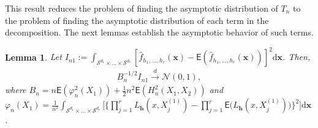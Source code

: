\documentclass{article}
\newtheorem{lemma}{Lemma}[section]
\begin{document}
This result reduces the problem of finding the asymptotic distribution of $T_n$ to the problem of finding the asymptotic distribution of each term in the decomposition. The next lemmas establish the asymptotic behavior of such terms.

\begin{lemma}
    Let $I_{n1} := \int_{\mathcal{S}^{d_1} \times \dots \times \mathcal{S}^{d_r}} [\hat{f}_{h_1, \dots, h_r}(\mathbf{x}) - \mathsf{E} (\hat{f}_{h_1, \dots, h_r}(\mathbf{x}))]^2 \mathrm{d} \mathbf{x}$. Then,
    \begin{align}
        B_n^{-1/2} I_{n1} \xrightarrow{d} \mathcal{N}(0, 1),
    \end{align}
    where $B_n = n \mathsf{E} (\varphi_n^2(X_1)) + \frac{1}{2} n^2 \mathsf{E}(H_n^2(X_1,X_2))$ and $\varphi_n(X_1) = \frac{1}{n^2} \int_{\mathcal{S}^{d_1} \times \dots \times \mathcal{S}^{d_r}} \Bigg[ \Bigg\{ \prod_{j=1}^{r} L_{\mathbf{h}} (x,X_j^{(1)}) - \prod_{j=1}^{r} \mathsf{E} \Big( L_{\mathbf{h}} (x,X_j^{(1)}) \Big) \Bigg\}^2 \Bigg] \mathrm{d} \mathbf{x}$.
\end{lemma}
\end{document}
